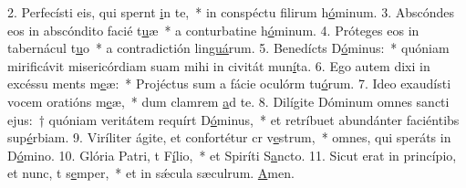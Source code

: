 2. Perfecísti eis, qui spernt \uline{i}n te,~* in conspéctu filirum h\uline{ó}minum.
3. Abscóndes eos in abscóndito facié t\uline{u}æ~* a conturbatine h\uline{ó}minum.
4. Próteges eos in tabernácul t\uline{u}o~* a contradictión lin\uline{guá}rum.
5. Benedícts D\uline{ó}minus:~* quóniam mirificávit misericórdiam suam mihi in civitát mun\uline{í}ta.
6. Ego autem dixi in excéssu ments m\uline{e}æ:~* Projéctus sum a fácie oculórm tu\uline{ó}rum.
7. Ideo exaudísti vocem oratións m\uline{e}æ,~* dum clamrem \uline{a}d te.
8. Dilígite Dóminum omnes sancti ejus:~† quóniam veritátem requírt D\uline{ó}minus,~* et retríbuet abundánter faciéntibs sup\uline{é}rbiam.
9. Viríliter ágite, et confortétur cr v\uline{e}strum,~* omnes, qui speráts in D\uline{ó}mino.
10. Glória Patri, t F\uline{í}lio,~* et Spiríti S\uline{a}ncto.
11. Sicut erat in princípio, et nunc, t s\uline{e}mper,~* et in sǽcula sæculrum. \uline{A}men.
